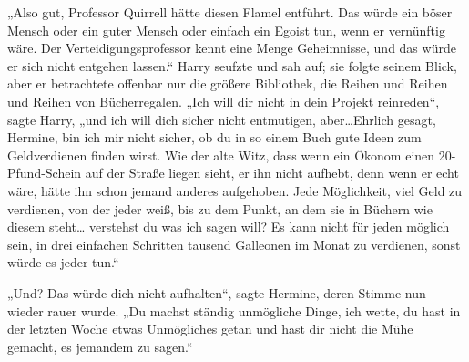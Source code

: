 „Also gut, Professor Quirrell hätte diesen Flamel entführt. Das würde ein böser Mensch oder ein guter Mensch oder einfach ein Egoist tun, wenn er vernünftig wäre. Der Verteidigungsprofessor kennt eine Menge Geheimnisse, und das würde er sich nicht entgehen lassen.“
Harry seufzte und sah auf; sie folgte seinem Blick, aber er betrachtete offenbar nur die größere Bibliothek, die Reihen und Reihen und Reihen von Bücherregalen.
„Ich will dir nicht in dein Projekt reinreden“, sagte Harry, „und ich will dich sicher nicht entmutigen, aber…Ehrlich gesagt, Hermine, bin ich mir nicht sicher, ob du in so einem Buch gute Ideen zum Geldverdienen finden wirst. Wie der alte Witz, dass wenn ein Ökonom einen 20-Pfund-Schein auf der Straße liegen sieht, er ihn nicht aufhebt, denn wenn er echt wäre, hätte ihn schon jemand anderes aufgehoben. Jede Möglichkeit, viel Geld zu verdienen, von der jeder weiß, bis zu dem Punkt, an dem sie in Büchern wie diesem steht… verstehst du was ich sagen will? Es kann nicht für jeden möglich sein, in drei einfachen Schritten tausend Galleonen im Monat zu verdienen, sonst würde es jeder tun.“

„Und? Das würde dich nicht aufhalten“, sagte Hermine, deren Stimme nun wieder rauer wurde. „Du machst ständig unmögliche Dinge, ich wette, du hast in der letzten Woche etwas Unmögliches getan und hast dir nicht die Mühe gemacht, es jemandem zu sagen.“

